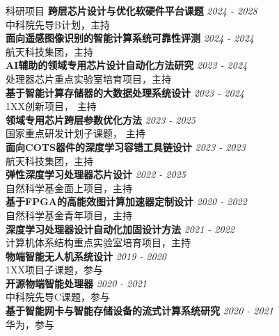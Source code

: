 \documentclass{resume} %
\begin{document}
\begin{rSection}{科研项目}
{\bf 跨层芯片设计与优化软硬件平台课题} \hfill {\em 2024 - 2028} \\ 
中科院先导B计划，主持\\
{\bf 面向遥感图像识别的智能计算系统可靠性评测} \hfill {\em 2024 - 2024} \\ 
航天科技集团，主持\\
{\bf AI辅助的领域专用芯片设计自动化方法研究} \hfill {\em 2023 - 2024} \\ 
处理器芯片重点实验室培育项目，主持\\
{\bf 基于智能计算存储器的大数据处理系统设计} \hfill {\em 2023 - 2024} \\
1XX创新项目， 主持\\
{\bf 领域专用芯片跨层参数优化方法} \hfill {\em 2023 - 2025} \\
国家重点研发计划子课题， 主持\\
{\bf 面向COTS器件的深度学习容错工具链设计} \hfill {\em 2023 - 2023} \\
航天科技集团，主持 \\
{\bf 弹性深度学习处理器芯片设计} \hfill {\em 2022 - 2025} \\
自然科学基金面上项目，主持 \\
{\bf 基于FPGA的高能效图计算加速器定制设计} \hfill {\em 2020 - 2022} \\
自然科学基金青年项目，主持 \\
{\bf 深度学习处理器设计自动化加固设计方法} \hfill {\em 2021 - 2022} \\
计算机体系结构重点实验室培育项目，主持 \\
{\bf 物端智能无人机系统设计} \hfill {\em 2019 - 2020} \\
1XX项目子课题，参与 \\
{\bf 开源物端智能处理器} \hfill {\em 2020 - 2021} \\
中科院先导C课题，参与 \\
{\bf 基于智能网卡与智能存储设备的流式计算系统研究} \hfill {\em 2020 - 2021} \\
华为，参与 \\
\end{rSection}
\end{document}
